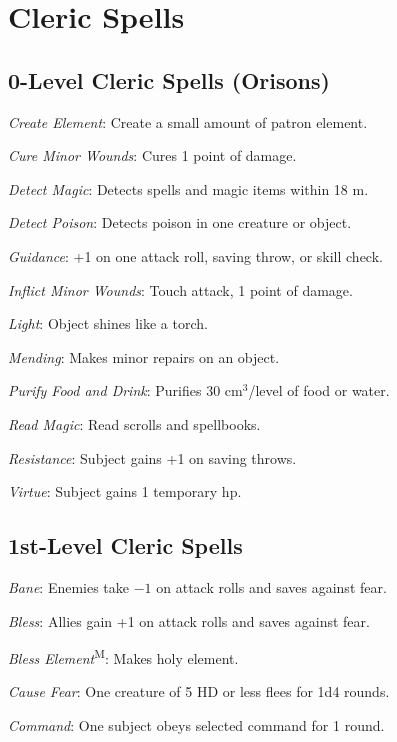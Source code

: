\section{Cleric Spells}



\subsection{0-Level Cleric Spells (Orisons)}

\textit{Create Element}: Create a small amount of patron element.

\textit{Cure Minor Wounds}: Cures 1 point of damage.

\textit{Detect Magic}: Detects spells and magic items within 18 m.

\textit{Detect Poison}: Detects poison in one creature or object.

\textit{Guidance}: +1 on one attack roll, saving throw, or skill check.

\textit{Inflict Minor Wounds}: Touch attack, 1 point of damage.

\textit{Light}: Object shines like a torch.

\textit{Mending}: Makes minor repairs on an object.

\textit{Purify Food and Drink}: Purifies 30 cm$^3$/level of food or water.

\textit{Read Magic}: Read scrolls and spellbooks.

\textit{Resistance}: Subject gains +1 on saving throws.

\textit{Virtue}: Subject gains 1 temporary hp.



\subsection{1st-Level Cleric Spells}

\textit{Bane}: Enemies take $-1$ on attack rolls and saves against fear.

\textit{Bless}: Allies gain +1 on attack rolls and saves against fear.

\textit{Bless Element}\textsuperscript{M}: Makes holy element.

\textit{Cause Fear}: One creature of 5 HD or less flees for 1d4 rounds.

\textit{Command}: One subject obeys selected command for 1 round.

